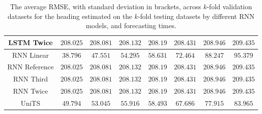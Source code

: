 \begin{table}[!ht]
{\begin{tabular}{|c|c|c|c|c|c|c|c|}
			LSTM Twice & $208.025$ & $208.081$ & $208.132$ & $208.19$ & $208.431$ & $208.946$ & $209.435$ \\ \hline
			RNN Linear & $\mathbf{38.796}$ & $\mathbf{47.551}$ & $\mathbf{54.295}$ & $58.631$ & $72.464$ & $88.247$ & $95.379$ \\ \hline
			RNN Reference & $208.025$ & $208.081$ & $208.132$ & $208.19$ & $208.431$ & $208.946$ & $209.435$ \\ \hline
			RNN Third & $208.025$ & $208.081$ & $208.132$ & $208.19$ & $208.431$ & $208.946$ & $209.435$ \\ \hline
			RNN Twice & $208.025$ & $208.081$ & $208.132$ & $208.19$ & $208.431$ & $208.946$ & $209.435$ \\ \hline
			UniTS & $49.794$ & $53.045$ & $55.916$ & $\mathbf{58.493}$ & $\mathbf{67.686}$ & $\mathbf{77.915}$ & $\mathbf{83.965}$ \\ \hline
		\end{tabular}
	}
	\caption{The average RMSE, with standard deviation in brackets, across $k$-fold validation datasets for the heading estimated on the $k$-fold testing datasets by different RNN models, and forecasting times.}
	\label{tab:all_direction_RMSE}
\end{table}

